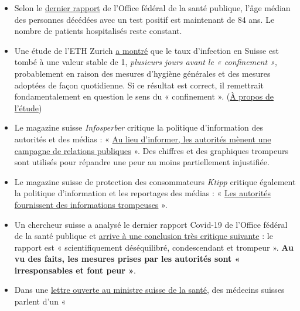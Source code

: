 \begin{itemize}
\tightlist
\item
  Selon le
  \href{https://www.bag.admin.ch/bag/de/home/krankheiten/ausbrueche-epidemien-pandemien/aktuelle-ausbrueche-epidemien/novel-cov/situation-schweiz-und-international.html}{dernier
  rapport} de l'Office fédéral de la santé publique, l'âge médian des
  personnes décédées avec un test positif est maintenant de 84 ans. Le
  nombre de patients hospitalisés reste constant.
\item
  Une étude de l'ETH Zurich
  \href{https://www.tagesanzeiger.ch/ansteckungsraten-flachten-bereits-vor-dem-lockdown-ab-809893127675}{a
  montré} que le taux d'infection en Suisse est tombé à une valeur
  stable de 1, \emph{plusieurs jours avant le « confinement »},
  probablement en raison des mesures d'hygiène générales et des mesures
  adoptées de façon quotidienne. Si ce résultat est correct, il
  remettrait fondamentalement en question le sens du « confinement ».
  (\href{https://bsse.ethz.ch/cevo/research/sars-cov-2/real-time-monitoring-in-switzerland.html}{À
  propos de l'étude})
\item
  Le magazine suisse \emph{Infosperber} critique la politique
  d'information des autorités et des médias : «
  \href{https://www.infosperber.ch/Artikel/Gesundheit/Corona-Statt-zu-informieren-fuhren-Behorden-eine-PR-Kampagne}{Au
  lieu d'informer, les autorités mènent une campagne de relations
  publiques} ». Des chiffres et des graphiques trompeurs sont utilisés
  pour répandre une peur au moins partiellement injustifiée.
\item
  Le magazine suisse de protection des consommateurs \emph{Ktipp}
  critique également la politique d'information et les reportages des
  médias : «
  \href{https://www.ktipp.ch/artikel/artikeldetail/behoerden-informieren-irrefuehrend/}{Les
  autorités fournissent des informations trompeuses} ».
\item
  Un chercheur suisse a analysé le dernier rapport Covid-19 de l'Office
  fédéral de la santé publique et
  \href{https://covid-19-fakten.blogspot.com/2020/04/die-analyse-des-aktuellen.html}{arrive
  à une conclusion très critique suivante} : le rapport est «
  scientifiquement déséquilibré, condescendant et trompeur ». \textbf{Au
  vu des faits, les mesures prises par les autorités sont «
  irresponsables et font peur »}.
\item
  Dans une \href{https://www.rontalpraxis.ch/aktuelles}{lettre ouverte
  au ministre suisse de la santé}, des médecins suisses parlent d'un «

\end{itemize}
